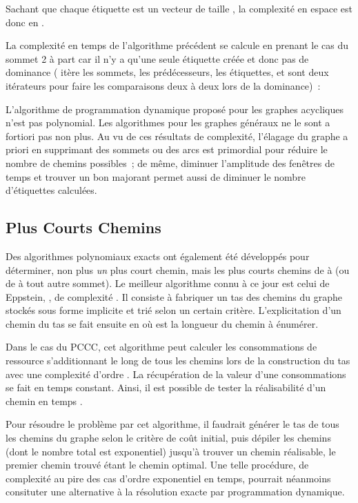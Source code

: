\documentclass[10pt,francais]{llncs}
\begin{document}
Sachant que chaque \'etiquette est un vecteur de taille , la complexit\'e en espace est donc en .

La complexit\'e en temps de l'algorithme pr\'ec\'edent se calcule en prenant le cas du sommet 2 \`a part car il n'y a qu'une seule \'etiquette cr\'e\'ee et donc pas de dominance ( it\`ere les sommets,  les pr\'ed\'ecesseurs,  les \'etiquettes,  et  sont deux it\'erateurs pour faire les comparaisons deux \`a deux lors de la dominance)~:


L'algorithme de programmation dynamique propos\'e pour les graphes acycliques n'est pas polynomial. Les algorithmes pour les graphes g\'en\'eraux ne le sont a fortiori pas non plus. Au vu de ces r\'esultats de complexit\'e, l'\'elagage du graphe a priori en supprimant des sommets ou des arcs est primordial pour r\'eduire le nombre de chemins possibles~; de m\^eme, diminuer l'amplitude des fen\^etres de temps et trouver un bon majorant permet aussi de diminuer le nombre d'\'etiquettes calcul\'ees.

\subsection{ Plus Courts Chemins}\label{sub-resol-kpcc}
Des algorithmes polynomiaux exacts ont \'egalement \'et\'e d\'evelopp\'es pour d\'eterminer, non plus {\em un} plus court chemin, mais les  plus courts chemins de  \`a  (ou de  \`a tout autre sommet). Le meilleur algorithme connu \`a ce jour est celui de Eppstein, \cite{Eppstein1998}, de complexit\'e . Il consiste \`a fabriquer un tas des chemins du graphe stock\'es sous forme implicite et tri\'e selon un certain crit\`ere. L'explicitation d'un chemin du tas se fait ensuite en  o\`u  est la longueur du chemin \`a \'enum\'erer.

Dans le cas du PCCC, cet algorithme peut calculer les consommations de ressource s'additionnant le long de tous les chemins lors de la construction du tas avec une complexit\'e d'ordre . La r\'ecup\'eration de la valeur d'une consommations se fait en temps constant. Ainsi, il est possible de tester la r\'ealisabilit\'e d'un chemin en temps . 

Pour r\'esoudre le probl\`eme par cet algorithme, il faudrait g\'en\'erer le tas de tous les chemins du graphe selon le crit\`ere de co\^ut initial, puis d\'epiler les chemins (dont le nombre total est exponentiel) jusqu'\`a trouver un chemin r\'ealisable, le premier chemin trouv\'e \'etant le chemin optimal. Une telle proc\'edure, de complexit\'e au pire des cas d'ordre exponentiel en temps, pourrait n\'eanmoins consituter une alternative \`a la r\'esolution exacte par programmation dynamique.
\end{document}
